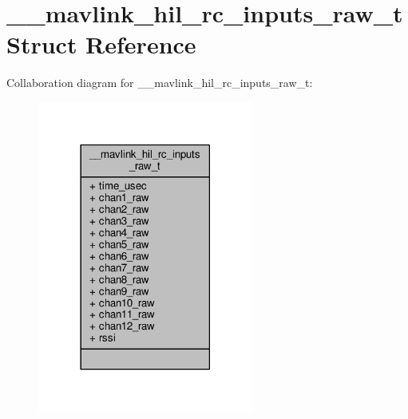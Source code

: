 \hypertarget{struct____mavlink__hil__rc__inputs__raw__t}{\section{\+\_\+\+\_\+mavlink\+\_\+hil\+\_\+rc\+\_\+inputs\+\_\+raw\+\_\+t Struct Reference}
\label{struct____mavlink__hil__rc__inputs__raw__t}
}


Collaboration diagram for \+\_\+\+\_\+mavlink\+\_\+hil\+\_\+rc\+\_\+inputs\+\_\+raw\+\_\+t\+:
\nopagebreak
\begin{figure}[H]
\begin{center}
\leavevmode
\includegraphics[width=201pt]{struct____mavlink__hil__rc__inputs__raw__t__coll__graph}
\end{center}
\end{figure}
